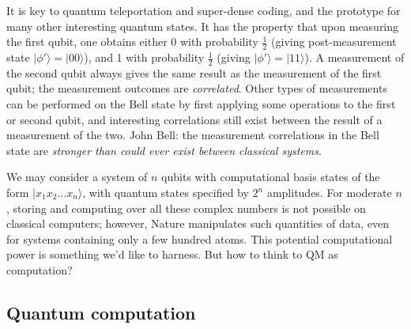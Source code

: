 \documentclass{article}
\numberwithin{equation}{section}
\newcommand{\bracket}[1]{|#1\rangle}
\begin{document}
It is key to quantum teleportation and super-dense coding, and the prototype for many other interesting quantum states. It has the property that upon measuring the first qubit, one obtains either 0 with probability $\frac{1}{2}$ (giving post-measurement state $\bracket{\phi'} = \bracket{00}$), and 1 with probability $\frac{1}{2}$ (giving $\bracket{\phi'} = \bracket{11}$). A measurement of the second qubit always gives the same result as the measurement of the first qubit; the measurement outcomes are \textit{correlated}. Other types of measurements can be performed on the Bell state by first applying some operations to the first or second qubit, and interesting correlations still exist between the result of a measurement of the two. John Bell: the measurement correlations in the Bell state are \textit{stronger than could ever exist between classical systems}.

We may consider a system of $n$ qubits with computational basis states of the form $\bracket{x_1 x_2 ... x_n}$, with quantum states specified by $2^n$ amplitudes. For moderate $n$, storing and computing over all these complex numbers is not possible on classical computers; however, Nature manipulates such quantities of data, even for systems containing only a few hundred atoms. This potential computational power is something we'd like to harness. But how to think to QM as computation?

\subsection{Quantum computation}
\end{document}
